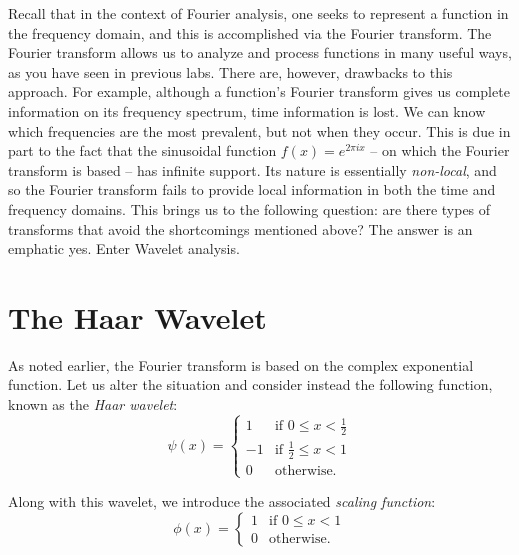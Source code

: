 

Recall that in the context of Fourier analysis, one seeks to represent a
function in the frequency domain, and this is accomplished via the Fourier
transform. The Fourier transform allows us to analyze and process functions
in many useful ways, as you have seen in previous labs. There are, however,
drawbacks to this approach. For example, although a function's Fourier
transform gives us complete information on its frequency spectrum, time
information is lost. We can know which frequencies are the
most prevalent, but not when they occur. This is due in part to the fact that
the sinusoidal function $f(x) = e^{2\pi ix}$ -- on which the Fourier transform
is based -- has infinite support. Its nature is essentially \emph{non-local},
and so the Fourier transform fails to provide local information in both the
time and frequency domains. This brings us to the following question: are
there types of transforms that avoid the shortcomings mentioned above? The
answer is an emphatic yes. Enter Wavelet analysis.

\section*{The Haar Wavelet}

As noted earlier, the Fourier transform is based on the complex exponential
function. Let us alter the situation and consider instead the following
function, known as the \emph{Haar wavelet}:
\begin{equation*}
\psi(x) =
 \begin{cases}
  1 & \text{if } 0 \leq x < \frac{1}{2} \\
  -1 & \text{if } \frac{1}{2} \leq x < 1 \\
  0 & \text{otherwise.}
 \end{cases}
\end{equation*}


Along with this wavelet, we introduce the associated \emph{scaling function}:
\begin{equation*}
\phi(x) =
 \begin{cases}
 1 & \text{if } 0 \leq x < 1 \\
 0 & \text{otherwise.}
 \end{cases}
\end{equation*}

